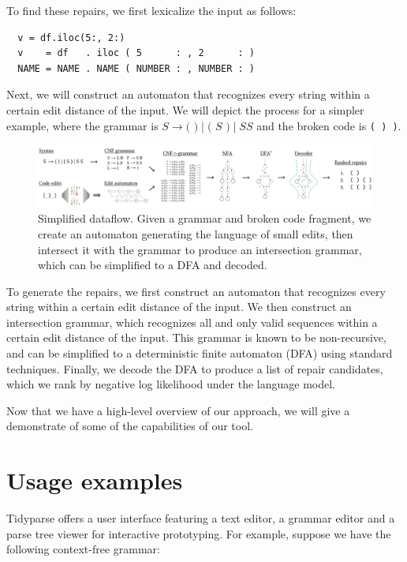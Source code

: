 \documentclass[runningheads]{llncs}
\begin{document}
\noindent To find these repairs, we first lexicalize the input as follows:

\begin{verbatim}
  v = df.iloc(5:, 2:)
  v    = df   . iloc ( 5      : , 2      : )
  NAME = NAME . NAME ( NUMBER : , NUMBER : )
\end{verbatim}

\noindent Next, we will construct an automaton that recognizes every string within a certain edit distance of the input. We will depict the process for a simpler example, where the grammar is $S \rightarrow \texttt{( )} \mid \texttt{( } S \texttt{ )} \mid S S$ and the broken code is \texttt{( ) )}.

\begin{figure}[h!]
  \includegraphics[width=\textwidth]{flow.pdf}\vspace{-1pt}
  \caption{Simplified dataflow. Given a grammar and broken code fragment, we create an automaton generating the language of small edits, then intersect it with the grammar to produce an intersection grammar, which can be simplified to a DFA and decoded.}\label{fig:arch_simp}
\end{figure}

To generate the repairs, we first construct an automaton that recognizes every string within a certain edit distance of the input. We then construct an intersection grammar, which recognizes all and only valid sequences within a certain edit distance of the input. This grammar is known to be non-recursive, and can be simplified to a deterministic finite automaton (DFA) using standard techniques. Finally, we decode the DFA to produce a list of repair candidates, which we rank by negative log likelihood under the language model.

Now that we have a high-level overview of our approach, we will give a demonstrate of some of the capabilities of our tool.

\section{Usage examples}

Tidyparse offers a user interface featuring a text editor, a grammar editor and a parse tree viewer for interactive prototyping. For example, suppose we have the following context-free grammar:
\end{document}
